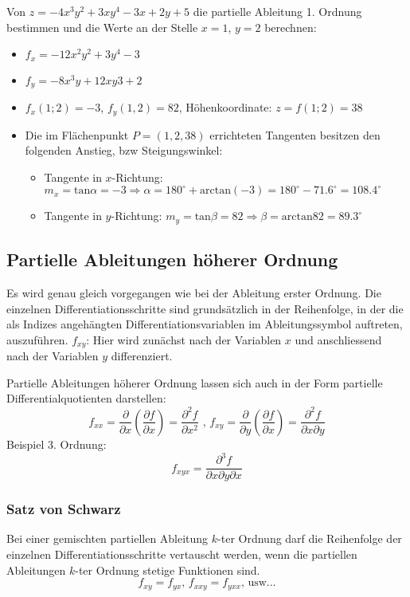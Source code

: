 \begin{bsp}
Von  $ z = -4x^3y^2 + 3xy^4 - 3x +2y +5$ die partielle Ableitung 1. Ordnung bestimmen und die Werte an der Stelle $x=1$, $y=2$ berechnen:
\begin{itemize}
		\item $f_x= -12x^2y^2+3y^4-3$
		\item $f_y = -8x^3y + 12xy3 +2$
		\item $f_x(1;2) = -3$, $f_y(1,2) = 82$, Höhenkoordinate: $z = f(1;2) = 38$
		\item Die im Flächenpunkt $P = (1, 2, 38)$ errichteten Tangenten besitzen den folgenden Anstieg, bzw Steigungswinkel:
		\begin{itemize}
			\item Tangente in $x$-Richtung: $m_x = \text{tan} \alpha = -3 \Rightarrow \alpha = 180^\circ + \text{arctan}(-3) = 180^\circ - 71.6^\circ = 108.4^\circ$
			\item Tangente in $y$-Richtung: $m_y =  \text{tan} \beta = 82 \Rightarrow \beta = \text{arctan} 82 = 89.3^\circ$
		\end{itemize}
\end{itemize}
\end{bsp}

\subsection{Partielle Ableitungen höherer Ordnung}
\begin{definition}
Es wird genau gleich vorgegangen wie bei der Ableitung erster Ordnung. Die einzelnen Differentiationsschritte sind grundsätzlich in der Reihenfolge, in der die als Indizes angehängten Differentiationsvariablen im Ableitungssymbol auftreten, auszuführen. $f_{xy}$: Hier wird zunächst nach der Variablen $x$ und anschliessend nach der Variablen $y$ differenziert.

Partielle Ableitungen höherer Ordnung lassen sich auch in der Form partielle Differentialquotienten darstellen:
$$
f_{xx} = \frac{\partial}{\partial x} \left( \frac{\partial f}{\partial x} \right) = \frac{\partial^2 f}{\partial x^2} 
\text{ , } 
f_{xy} = \frac{\partial}{\partial y} \left( \frac{\partial f}{\partial x} \right) = \frac{\partial^2 f}{\partial x \partial y} 
$$
Beispiel 3. Ordnung:
$$ f_{xyx} = \frac{\partial^3 f}{\partial x \partial y \partial x} $$
\end{definition}

\subsubsection{Satz von Schwarz}
\begin{definition}
Bei einer gemischten partiellen Ableitung $k$-ter Ordnung darf die Reihenfolge der einzelnen Differentiationsschritte vertauscht werden, wenn die partiellen Ableitungen $k$-ter Ordnung stetige Funktionen sind.
$$ f_{xy} = f_{yx} \text{, }  f_{xxy} = f_{yxx} \text{, usw...}$$
\end{definition}

